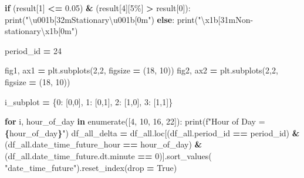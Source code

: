\documentclass[mstat,12pt]{unswthesis}
\newenvironment{Shaded}{\begin{snugshade}}{\end{snugshade}}
\newcommand{\BuiltInTok}[1]{#1}
\newcommand{\CharTok}[1]{\textcolor[rgb]{0.31,0.60,0.02}{#1}}
\newcommand{\ControlFlowTok}[1]{\textcolor[rgb]{0.13,0.29,0.53}{\textbf{#1}}}
\newcommand{\DecValTok}[1]{\textcolor[rgb]{0.00,0.00,0.81}{#1}}
\newcommand{\FloatTok}[1]{\textcolor[rgb]{0.00,0.00,0.81}{#1}}
\newcommand{\KeywordTok}[1]{\textcolor[rgb]{0.13,0.29,0.53}{\textbf{#1}}}
\newcommand{\NormalTok}[1]{#1}
\newcommand{\OperatorTok}[1]{\textcolor[rgb]{0.81,0.36,0.00}{\textbf{#1}}}
\newcommand{\SpecialCharTok}[1]{\textcolor[rgb]{0.81,0.36,0.00}{\textbf{#1}}}
\newcommand{\SpecialStringTok}[1]{\textcolor[rgb]{0.31,0.60,0.02}{#1}}
\newcommand{\StringTok}[1]{\textcolor[rgb]{0.31,0.60,0.02}{#1}}
\newcommand{\VariableTok}[1]{\textcolor[rgb]{0.00,0.00,0.00}{#1}}
\begin{document}
\begin{Shaded}
\begin{Highlighting}[]
    \ControlFlowTok{if}\NormalTok{ (result[}\DecValTok{1}\NormalTok{] }\OperatorTok{\textless{}=} \FloatTok{0.05}\NormalTok{) }\OperatorTok{\&}\NormalTok{ (result[}\DecValTok{4}\NormalTok{][}\StringTok{\textquotesingle{}5\%\textquotesingle{}}\NormalTok{] }\OperatorTok{\textgreater{}}\NormalTok{ result[}\DecValTok{0}\NormalTok{]):}
        \BuiltInTok{print}\NormalTok{(}\StringTok{"}\CharTok{\textbackslash{}u001b}\StringTok{[32mStationary}\CharTok{\textbackslash{}u001b}\StringTok{[0m"}\NormalTok{)}
    \ControlFlowTok{else}\NormalTok{:}
        \BuiltInTok{print}\NormalTok{(}\StringTok{"}\CharTok{\textbackslash{}x1b}\StringTok{[31mNon{-}stationary}\CharTok{\textbackslash{}x1b}\StringTok{[0m"}\NormalTok{)}


\NormalTok{period\_id }\OperatorTok{=} \DecValTok{24}

\NormalTok{fig1, ax1 }\OperatorTok{=}\NormalTok{ plt.subplots(}\DecValTok{2}\NormalTok{,}\DecValTok{2}\NormalTok{, figsize }\OperatorTok{=}\NormalTok{ (}\DecValTok{18}\NormalTok{, }\DecValTok{10}\NormalTok{))}
\NormalTok{fig2, ax2 }\OperatorTok{=}\NormalTok{ plt.subplots(}\DecValTok{2}\NormalTok{,}\DecValTok{2}\NormalTok{, figsize }\OperatorTok{=}\NormalTok{ (}\DecValTok{18}\NormalTok{, }\DecValTok{10}\NormalTok{))}

\NormalTok{i\_subplot }\OperatorTok{=}\NormalTok{ \{}\DecValTok{0}\NormalTok{: [}\DecValTok{0}\NormalTok{,}\DecValTok{0}\NormalTok{], }\DecValTok{1}\NormalTok{: [}\DecValTok{0}\NormalTok{,}\DecValTok{1}\NormalTok{], }\DecValTok{2}\NormalTok{: [}\DecValTok{1}\NormalTok{,}\DecValTok{0}\NormalTok{], }\DecValTok{3}\NormalTok{: [}\DecValTok{1}\NormalTok{,}\DecValTok{1}\NormalTok{]\}}

\ControlFlowTok{for}\NormalTok{ i, hour\_of\_day }\KeywordTok{in} \BuiltInTok{enumerate}\NormalTok{([}\DecValTok{4}\NormalTok{, }\DecValTok{10}\NormalTok{, }\DecValTok{16}\NormalTok{, }\DecValTok{22}\NormalTok{]):}
    \BuiltInTok{print}\NormalTok{(}\SpecialStringTok{f"Hour of Day = }\SpecialCharTok{\{}\NormalTok{hour\_of\_day}\SpecialCharTok{\}}\SpecialStringTok{"}\NormalTok{)}
\NormalTok{    df\_all\_delta }\OperatorTok{=}\NormalTok{ df\_all.loc[(df\_all.period\_id }\OperatorTok{==}\NormalTok{ period\_id) }\OperatorTok{\&}
\NormalTok{      (df\_all.date\_time\_future\_hour }\OperatorTok{==}\NormalTok{ hour\_of\_day) }\OperatorTok{\&}
\NormalTok{      (df\_all.date\_time\_future.dt.minute }\OperatorTok{==} \DecValTok{0}\NormalTok{)].sort\_values(}
          \StringTok{"date\_time\_future"}\NormalTok{).reset\_index(drop }\OperatorTok{=} \VariableTok{True}\NormalTok{)}


\end{Highlighting}
\end{Shaded}
\end{document}
